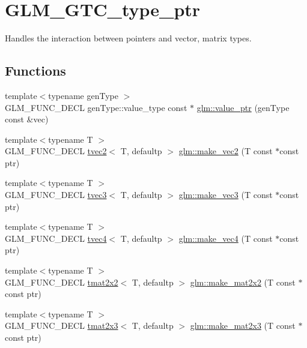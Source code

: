 \hypertarget{group__gtc__type__ptr}{}\section{G\+L\+M\+\_\+\+G\+T\+C\+\_\+type\+\_\+ptr}
\label{group__gtc__type__ptr}


Handles the interaction between pointers and vector, matrix types.  


\subsection*{Functions}
\begin{DoxyCompactItemize}
\item 
{\footnotesize template$<$typename gen\+Type $>$ }\\G\+L\+M\+\_\+\+F\+U\+N\+C\+\_\+\+D\+E\+CL gen\+Type\+::value\+\_\+type const  $\ast$ \hyperlink{group__gtc__type__ptr_gaf019636bb8bd7c9efb7c7ce3bb23bcfc}{glm\+::value\+\_\+ptr} (gen\+Type const \&vec)
\item 
{\footnotesize template$<$typename T $>$ }\\G\+L\+M\+\_\+\+F\+U\+N\+C\+\_\+\+D\+E\+CL \hyperlink{structglm_1_1tvec2}{tvec2}$<$ T, defaultp $>$ \hyperlink{group__gtc__type__ptr_ga5f7393c30970c5949be13ceb525093a6}{glm\+::make\+\_\+vec2} (T const $\ast$const ptr)
\item 
{\footnotesize template$<$typename T $>$ }\\G\+L\+M\+\_\+\+F\+U\+N\+C\+\_\+\+D\+E\+CL \hyperlink{structglm_1_1tvec3}{tvec3}$<$ T, defaultp $>$ \hyperlink{group__gtc__type__ptr_ga86f4bc63570db86346db2e567fb760f6}{glm\+::make\+\_\+vec3} (T const $\ast$const ptr)
\item 
{\footnotesize template$<$typename T $>$ }\\G\+L\+M\+\_\+\+F\+U\+N\+C\+\_\+\+D\+E\+CL \hyperlink{structglm_1_1tvec4}{tvec4}$<$ T, defaultp $>$ \hyperlink{group__gtc__type__ptr_ga152345176b8951c15711f6ed4f6fc237}{glm\+::make\+\_\+vec4} (T const $\ast$const ptr)
\item 
{\footnotesize template$<$typename T $>$ }\\G\+L\+M\+\_\+\+F\+U\+N\+C\+\_\+\+D\+E\+CL \hyperlink{structglm_1_1tmat2x2}{tmat2x2}$<$ T, defaultp $>$ \hyperlink{group__gtc__type__ptr_gadb29e510762e1042069cb28bf24ae990}{glm\+::make\+\_\+mat2x2} (T const $\ast$const ptr)
\item 
{\footnotesize template$<$typename T $>$ }\\G\+L\+M\+\_\+\+F\+U\+N\+C\+\_\+\+D\+E\+CL \hyperlink{structglm_1_1tmat2x3}{tmat2x3}$<$ T, defaultp $>$ \hyperlink{group__gtc__type__ptr_ga37988c6dd941f617cdfab86d54375fc1}{glm\+::make\+\_\+mat2x3} (T const $\ast$const ptr)

\end{DoxyCompactItemize}
